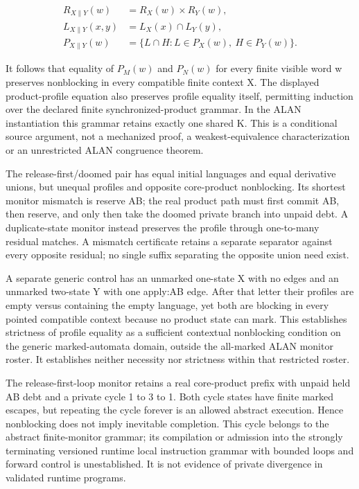 \documentclass[11pt,a4paper]{article}
\theoremstyle{definition}
\theoremstyle{remark}
\begin{document}
\[
\begin{aligned}
R_{X\parallel Y}(w)&=R_X(w)\times R_Y(w),\\
L_{X\parallel Y}(x,y)&=L_X(x)\cap L_Y(y),\\
P_{X\parallel Y}(w)&=\{L\cap H:L\in P_X(w),\ H\in P_Y(w)\}.
\end{aligned}
\]

It follows that equality of $P_M(w)$ and $P_N(w)$ for every finite visible word w preserves nonblocking in every compatible finite context X. The displayed product-profile equation also preserves profile equality itself, permitting induction over the declared finite synchronized-product grammar. In the ALAN instantiation this grammar retains exactly one shared K. This is a conditional source argument, not a mechanized proof, a weakest-equivalence characterization or an unrestricted ALAN congruence theorem.

The release-first/doomed pair has equal initial languages and equal derivative unions, but unequal profiles and opposite core-product nonblocking. Its shortest monitor mismatch is reserve AB; the real product path must first commit AB, then reserve, and only then take the doomed private branch into unpaid debt. A duplicate-state monitor instead preserves the profile through one-to-many residual matches. A mismatch certificate retains a separate separator against every opposite residual; no single suffix separating the opposite union need exist.

A separate generic control has an unmarked one-state X with no edges and an unmarked two-state Y with one apply:AB edge. After that letter their profiles are empty versus containing the empty language, yet both are blocking in every pointed compatible context because no product state can mark. This establishes strictness of profile equality as a sufficient contextual nonblocking condition on the generic marked-automata domain, outside the all-marked ALAN monitor roster. It establishes neither necessity nor strictness within that restricted roster.

The release-first-loop monitor retains a real core-product prefix with unpaid held AB debt and a private cycle 1 to 3 to 1. Both cycle states have finite marked escapes, but repeating the cycle forever is an allowed abstract execution. Hence nonblocking does not imply inevitable completion. This cycle belongs to the abstract finite-monitor grammar; its compilation or admission into the strongly terminating versioned runtime local instruction grammar with bounded loops and forward control is unestablished. It is not evidence of private divergence in validated runtime programs.
\end{document}
